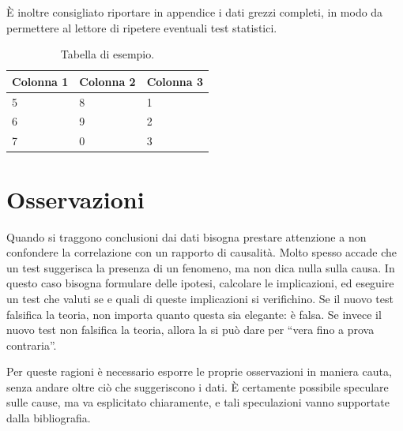 \`E inoltre consigliato riportare in appendice i dati grezzi completi, in modo da permettere al lettore di ripetere eventuali test statistici.

\begin{table}
	\centering
    \begin{tabular}{|l|l|l|}
	\hline
	Colonna 1 & Colonna 2 & Colonna 3 \\ \hline
	5         & 8         & 1         \\
	6         & 9         & 2         \\
	7         & 0         & 3         \\ \hline
\end{tabular}
	\caption{Tabella di esempio.}
	\label{tab:sample}
\end{table}

\section{Osservazioni}

Quando si traggono conclusioni dai dati bisogna prestare attenzione a non confondere la correlazione con un rapporto di causalità. Molto spesso accade che un test suggerisca la presenza di un fenomeno, ma non dica nulla sulla causa. In questo caso bisogna formulare delle ipotesi, calcolare le implicazioni, ed eseguire un test che valuti se e quali di queste implicazioni si verifichino. Se il nuovo test falsifica la teoria, non importa quanto questa sia elegante: è falsa. Se invece il nuovo test non falsifica la teoria, allora la si può dare per ``vera fino a prova contraria''.

Per queste ragioni è necessario esporre le proprie osservazioni in maniera cauta, senza andare oltre ciò che suggeriscono i dati. \`E certamente possibile speculare sulle cause, ma va esplicitato chiaramente, e tali speculazioni vanno supportate dalla bibliografia.

